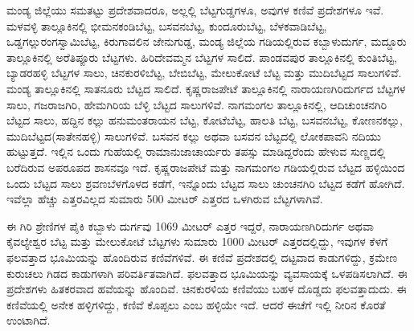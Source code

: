 ಮಂಡ್ಯ ಜಿಲ್ಲೆಯು ಸಮತಟ್ಟು ಪ್ರದೇಶವಾದರೂ, ಅಲ್ಲಲ್ಲಿ ಬೆಟ್ಟಗುಡ್ಡಗಳೂ, ಅವುಗಳ ಕಣಿವೆ ಪ್ರದೇಶಗಳೂ ಇವೆ. ಮಳವಳ್ಳಿ ತಾಲ್ಲೂಕಿನಲ್ಲಿ ಭೀಮನಕಂಡಿಬೆಟ್ಟ, ಬಸವನಬೆಟ್ಟ, ಕುಂದೂರುಬೆಟ್ಟ, ಬೆಳಕವಾಡಿಬೆಟ್ಟ, ಒಡ್ಡಗಲ್ಲುರಂಗಸ್ವಾಮಿಬೆಟ್ಟ, ಕಿರುಗಾವಲಿನ ಜೇನುಗುಡ್ಡ, ಮಂಡ್ಯ ಜಿಲ್ಲೆಯ ಗಡಿಯಲ್ಲಿರುವ ಕಬ್ಬಾಳುದುರ್ಗ, ಮದ್ದೂರು ತಾಲ್ಲೂಕಿನಲ್ಲಿ ಅರೆತಿಪ್ಪೂರು ಬೆಟ್ಟಗಳು. ಹಿರಿದೇವಮ್ಮನ ಬೆಟ್ಟಗಳ ಸಾಲಿದೆ. ಪಾಂಡವಪುರ ತಾಲ್ಲೂಕಿನಲ್ಲಿ ಕುಂತಿಬೆಟ್ಟ, ಬ್ಯಾಡರಹಳ್ಳಿ ಬೆಟ್ಟಗಳ ಸಾಲು, ಚಿನಕುರಳಿಬೆಟ್ಟ, ಬೇಬಿಬೆಟ್ಟ, ಮೇಲುಕೋಟೆ ಬೆಟ್ಟ ಮತ್ತು ಮುದಿಬೆಟ್ಟದ ಸಾಲುಗಳಿವೆ. ಮಂಡ್ಯ ತಾಲ್ಲೂಕಿನಲ್ಲಿ ಸಾತನೂರು ಬೆಟ್ಟದ ಸಾಲಿದೆ. ಕೃಷ್ಣರಾಜಪೇಟೆ ತಾಲ್ಲೂಕಿನಲ್ಲಿ ನಾರಾಯಣಗಿರಿದುರ್ಗದ ಬೆಟ್ಟಗಳ ಸಾಲು, ಗಜರಾಜಗಿರಿ, ಹೇಮಗಿರಿಯ ಬೆಳ್ಳಿ ಬೆಟ್ಟದ ಸಾಲುಗಳಿವೆ. ನಾಗಮಂಗಲ ತಾಲ್ಲೂಕಿನಲ್ಲಿ, ಆದಿಚುಂಚನಗಿರಿ ಬೆಟ್ಟದ ಸಾಲು, ಹದ್ದಿನ ಕಲ್ಲು ಹನುಮಂತರಾಯನ ಬೆಟ್ಟ, ಕೋಟೆಬೆಟ್ಟ, ಹಾಲತಿ ಬೆಟ್ಟ, ಬಸವನಬೆಟ್ಟ, ಕೋಣನಕಲ್ಲು, ಮುದಿಬೆಟ್ಟದ(ಸಾತೇನಹಳ್ಳಿ) ಸಾಲುಗಳಿವೆ. ಬಸವನ ಕಲ್ಲು ಅಥವಾ ಬಸವನ ಬೆಟ್ಟದಲ್ಲಿ ಲೋಕಪಾವನಿ ನದಿಯು ಹುಟ್ಟುತ್ತದೆ. ಇಲ್ಲಿನ ಒಂದು ಗುಹೆಯಲ್ಲಿ ರಾಮಾನುಜಾಚಾರ್ಯರು ತಪಸ್ಸು ಮಾಡಿದ್ದರೆಂದು ಹೇಳುವ ಸುಣ್ಣದಲ್ಲಿ ಬರೆದಿರುವ ಅಪರೂಪದ ಶಾಸನವೂ ಇದೆ. ಕೃಷ್ಣರಾಜಪೇಟೆ ಮತ್ತು ನಾಗಮಂಗಲ ಗಡಿಯಲ್ಲಿರುವ ಬೆಟ್ಟದ ಹಳ್ಳಿಯಿಂದ ಒಂದು ಬೆಟ್ಟದ ಸಾಲು ಶ್ರವಣಬೆಳಗೊಳದ ಕಡೆಗೆ, ಇನ್ನೊಂದು ಬೆಟ್ಟದ ಸಾಲು ಚುಂಚನಗಿರಿ ಬೆಟ್ಟದ ಕಡೆಗೆ ಹೋಗಿದೆ. ಇವೆಲ್ಲಾ ಹೆಚ್ಚು ಎತ್ತರವಿಲ್ಲದ ಸುಮಾರು 500 ಮೀಟರ್ ಎತ್ತರದ ಒಳಗಿರುವ ಬೆಟ್ಟಗಳಾಗಿವೆ.

ಈ ಗಿರಿ ಶ್ರೇಣಿಗಳ ಪೈಕಿ ಕಬ್ಬಾಳು ದುರ್ಗವು 1069 ಮೀಟರ್ ಎತ್ತರ ಇದ್ದರೆ, ನಾರಾಯಣಗಿರಿದುರ್ಗ ಅಥವಾ ಕೈವಲ್ಯೇಶ್ವರ ಬೆಟ್ಟ ಮತ್ತು ಮೇಲುಕೋಟೆ ಬೆಟ್ಟಗಳು ಸುಮಾರು 1000 ಮೀಟರ್​ ಎತ್ತರದಲ್ಲಿದ್ದು, ಇವುಗಳ ಕೆಳಗೆ ಫಲವತ್ತಾದ ಭೂಮಿಯನ್ನು ಹೊಂದಿರುವ ಕಣಿವೆಗಳಿವೆ. ಈ ಕಣಿವೆ ಪ್ರದೇಶದಲ್ಲಿ ದಟ್ಟವಾದ ಕಾಡುಗಳಿದ್ದು, ಕ್ರಮೇಣ ಕುರುಚಲು ಗಿಡದ ಕಾಡುಗಳಾಗಿ ಪರಿವರ್ತಿತವಾಗಿದೆ. ಫಲವತ್ತಾದ ಭೂಮಿಯನ್ನು ವ್ಯವಸಾಯಕ್ಕೆ ಒಳಪಡಿಸಲಾಗಿದೆ. ಈ ಪ್ರದೇಶಗಳು ಹಿತಕರವಾದ ಹವೆಯನ್ನು ಹೊಂದಿವೆ. ಚಿನಕುರಳಿಯ ಕಣಿವೆಯು ಬಹಳ ದೊಡ್ಡದು ಫಲವತ್ತಾದುದು. ಈ ಕಣಿವೆಯಲ್ಲಿ ಅನೇಕ ಹಳ್ಳಿಗಳಿದ್ದು, ಕಣಿವೆ ಕೊಪ್ಪಲು ಎಂಬ ಹಳ್ಳಿಯೇ ಇದೆ. ಆದರೆ ಈಚೆಗೆ ಇಲ್ಲಿ ನೀರಿನ ಕೊರತೆ ಉಂಟಾಗಿದೆ.

\vskip -3pt

